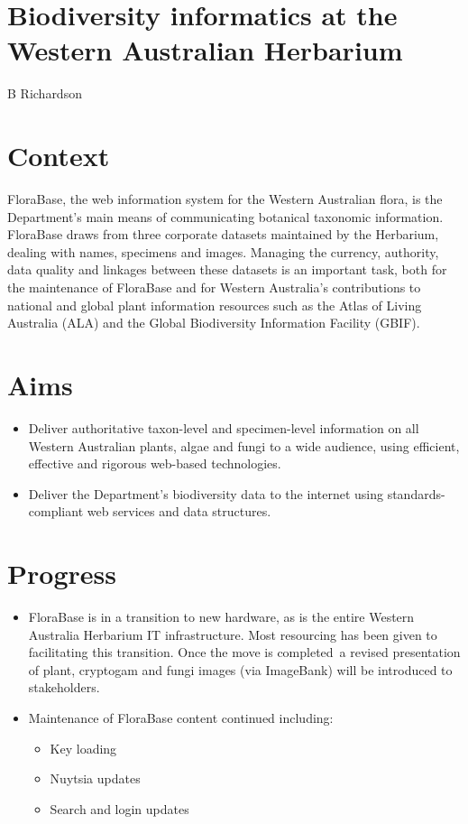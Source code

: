 \documentclass[version=last,
    paper=a4, %
    10pt, %
    usenames,
    dvipsnames,
    oneside, %
    headings=openany, %
    DIV=15 %
]{scrbook}
\begin{document}
\section*{Biodiversity informatics at the Western Australian Herbarium
}

B Richardson


\section*{Context}
FloraBase, the web information system for the Western Australian flora,
is the Department's main means of communicating botanical taxonomic
information. FloraBase draws from three corporate datasets maintained by
the Herbarium, dealing with names, specimens and images. Managing the
currency, authority, data quality and linkages between these datasets is
an important task, both for the maintenance of FloraBase and for Western
Australia's contributions to national and global plant information
resources such as the Atlas of Living Australia (ALA) and the Global
Biodiversity Information Facility (GBIF).



\section*{Aims}
\begin{itemize}
\itemsep1pt\parskip0pt
\item
  Deliver authoritative taxon-level and specimen-level information on
  all Western Australian plants, algae and fungi to a wide audience,
  using efficient, effective and rigorous web-based technologies.
\item
  Deliver the Department's biodiversity data to the internet using
  standards-compliant web services and data structures.
\end{itemize}



\section*{Progress}
\begin{itemize}
\itemsep1pt\parskip0pt
\item
  FloraBase is in a transition to new hardware, as is the entire Western
  Australia Herbarium IT infrastructure. Most resourcing has been given
  to facilitating this transition. Once the move is completed~a revised
  presentation of plant, cryptogam and fungi images (via ImageBank) will
  be introduced to stakeholders.
\item
  Maintenance of FloraBase content continued including:

  \begin{itemize}
  \itemsep1pt\parskip0pt
  \item
    Key loading
  \item
    Nuytsia updates
  \item
    Search and login updates
  \end{itemize}
\end{itemize}
\end{document}
